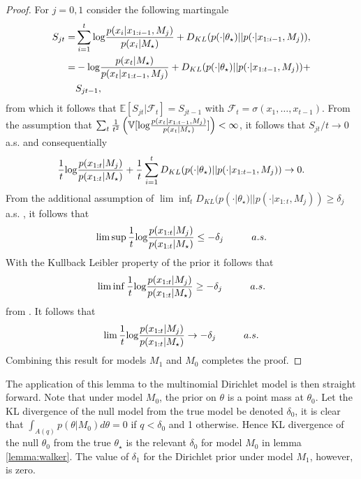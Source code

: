 \documentclass[11pt]{article}
\def\log{{\rm log}}
\begin{document}
\begin{proof}
  For $j=0,1$ consider the following martingale
  \begin{align*}
    \label{eq:walker_martingale}
    S_{jt} =& \sum_{i=1}^{t} \log \frac{p(x_i|x_{1:i-1},M_j)}{p(x_i|M_\star)} + D_{KL}(p(\cdot|\theta_\star)||p(\cdot|x_{1:i-1}, M_j) ),\\
    =& -\log \frac{p(x_t|M_\star)}{p(x_t|x_{1:t-1},M_j)} + D_{KL}(p(\cdot|\theta_\star)||p(\cdot|x_{1:t-1}, M_j) ) +\\
    &S_{jt-1},\\
  \end{align*}
  from which it follows that $\mathbb{E}[S_{jt}|\mathcal{F}_t] = S_{jt-1}$ with $\mathcal{F}_t = \sigma(x_1,\dots,x_{t-1})$.
From the assumption that  $\sum_t \frac{1}{t^2} \left( \mathbb{V}[\log \frac{p(x_t|x_{1:t-1},M_j)}{p(x_t|M_\star )}]\right) < \infty$, it follows that $S_{jt}/t \rightarrow 0$ a.s.
and consequentially
  \begin{align*}
    \frac{1}{t} \log \frac{p(x_{1:t}|M_j)}{p(x_{1:t}|M_\star)} + \frac{1}{t}\sum_{i=1}^t  D_{KL}(p(\cdot|\theta_\star)||p(\cdot|x_{1:t-1}, M_j) )\rightarrow 0.
  \end{align*}
  From the additional assumption of $\lim \inf_t D_{KL}(p(\cdot|\theta_\star)||p(\cdot|x_{1:t}, M_j) ) \geq \delta_j$ a.s.
, it follows that
  \begin{align*}
    \lim \sup   \frac{1}{t} \log \frac{p(x_{1:t}|M_j)}{p(x_{1:t}|M_\star)} \leq - \delta_j \hspace{1cm} a.s.
  \end{align*}
  With the Kullback Leibler property of the prior it follows that
  \begin{align*}
     \lim \inf   \frac{1}{t} \log \frac{p(x_{1:t}|M_j)}{p(x_{1:t}|M_\star)} \geq - \delta_j \hspace{1cm} a.s.
  \end{align*}
  from \cite{barron}.
It follows that
    \begin{align*}
     \lim   \frac{1}{t} \log \frac{p(x_{1:t}|M_j)}{p(x_{1:t}|M_\star)} \rightarrow - \delta_j \hspace{1cm} a.s.
    \end{align*}
    Combining this result for models $M_1$ and $M_0$ completes the proof.
\end{proof}

The application of this lemma to the multinomial Dirichlet model is then straight forward.
Note that under model $M_0$, the prior on $\theta$ is a point mass at $\theta_0$.
Let the KL divergence of the null model from the true model be denoted $\delta_0$, it is clear that $\int_{A(q)} p(\theta|M_0) d\theta = 0$ if $q<\delta_0$ and 1 otherwise.
Hence KL divergence of the null $\theta_0$ from the true $\theta_\star$ is the relevant $\delta_0$ for model $M_0$ in lemma \ref{lemma:walker}.
The value of $\delta_1$ for the Dirichlet prior under model $M_1$, however, is zero.
\end{document}
